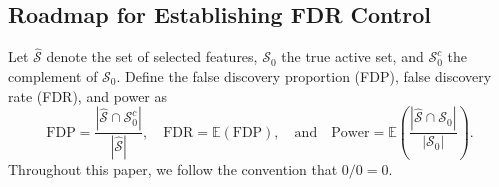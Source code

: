 ﻿\documentclass[12pt]{article}
\newcommand{\0}{\mbox{\bf 0}}
\theoremstyle{plain}%
\theoremstyle{definition}
\begin{document}
{

\iffalse

\subsection{Roadmap for Establishing FDR Control}

Let $\widehat{\mathcal{S}}$ denote the set of selected features, $\mathcal{S}_0$ the true active set, and $\mathcal{S}_0^c$ the complement of $\mathcal{S}_0$. Define the false discovery proportion (FDP), false discovery rate (FDR), and power as
\begin{equation*}
\text{FDP} = \frac{|\widehat{\mathcal{S}} \cap \mathcal{S}_0^c|}{|\widehat{\mathcal{S}}|}, \quad 
\text{FDR} = \mathbb{E}(\text{FDP}), \quad
\text{and} \quad 
\text{Power} = \mathbb{E} \left( \frac{|\widehat{\mathcal{S}} \cap \mathcal{S}_0|}{|\mathcal{S}_0|} \right).
\end{equation*}
Throughout this paper, we follow the convention that $0/0 = 0$. 

}
\end{document}
